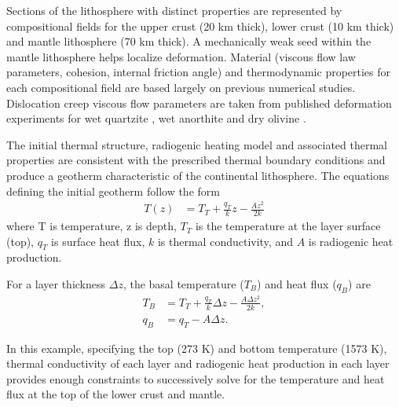\documentclass{article}
\begin{document}


Sections of the lithosphere with distinct properties are represented by compositional fields for the upper crust (20 km thick), lower crust (10 km thick) and mantle lithosphere (70 km thick). A mechanically weak seed within the mantle lithosphere helps localize deformation. Material (viscous flow law parameters, cohesion, internal friction angle) and thermodynamic properties for each compositional field are based largely on previous numerical studies.   Dislocation creep viscous flow parameters are taken from published deformation experiments for wet quartzite \cite{RB04}, wet anorthite \cite{RGWD06} and dry olivine \cite{HK04}. 



The initial thermal structure, radiogenic heating model and associated thermal properties are consistent with the prescribed thermal boundary conditions and produce a geotherm characteristic of the continental lithosphere. The equations defining the initial geotherm \cite{Cha86} follow the form
\begin{align}
  \label{eq:continental-geotherm-1}
  T(z) &= T_T + \frac{q_T}{k}z - \frac{Az^2}{2k}
\end{align}
where T is temperature, z is depth, $T_T$ is the temperature at the layer surface (top), $q_T$ is surface heat flux, $k$ is thermal conductivity, and $A$ is radiogenic heat production.

For a layer thickness $\Delta z$, the basal temperature ($T_B$) and heat flux ($q_B$) are
\begin{align}
  \label{eq:continental-geotherm-2}
  T_B &= T_T + \frac{q_T}{k} \Delta z - \frac{A \Delta z^2}{2k},
  \\
  \label{eq:continental-geotherm-3}
  q_B &= q_T - A \Delta z.
\end{align}

In this example, specifying the top (273 K) and bottom temperature (1573 K), thermal conductivity of each layer and radiogenic heat production in each layer provides enough constraints to successively solve for the temperature and heat flux at the top of the lower crust and mantle.
\end{document}
